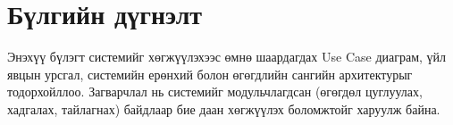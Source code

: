 \section{Бүлгийн дүгнэлт}
Энэхүү бүлэгт системийг хөгжүүлэхээс өмнө шаардагдах Use Case диаграм, үйл явцын урсгал, системийн ерөнхий болон өгөгдлийн сангийн архитектурыг тодорхойллоо. Загварчлал нь системийг модульчлагдсан (өгөгдөл цуглуулах, хадгалах, тайлагнах) байдлаар бие даан хөгжүүлэх боломжтойг харуулж байна.
